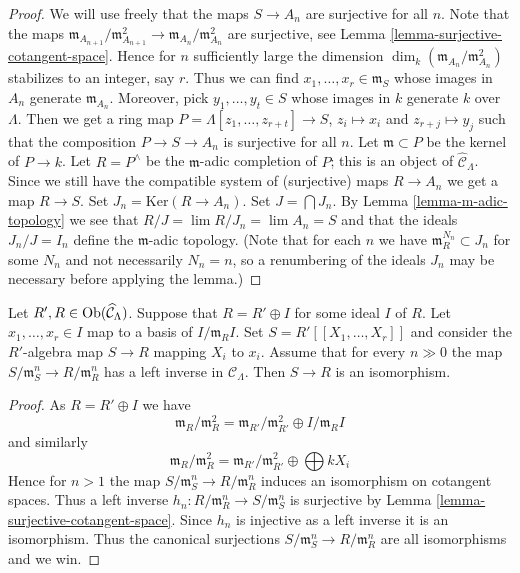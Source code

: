 \begin{proof}
We will use freely that the maps $S \to A_n$ are surjective for all $n$.
Note that the maps
$\mathfrak m_{A_{n + 1}}/\mathfrak m_{A_{n + 1}}^2 \to
\mathfrak m_{A_n}/\mathfrak m_{A_n}^2$ are surjective, see
Lemma \ref{lemma-surjective-cotangent-space}.
Hence for $n$ sufficiently large the dimension
$\dim_k (\mathfrak m_{A_n}/\mathfrak m_{A_n}^2)$ stabilizes to an
integer, say $r$.
Thus we can find $x_1, \ldots, x_r \in \mathfrak m_S$ whose images in
$A_n$ generate $\mathfrak m_{A_n}$. Moreover, pick $y_1, \ldots, y_t \in S$
whose images in $k$ generate $k$ over $\Lambda$. Then we get a ring map
$P = \Lambda[z_1, \ldots, z_{r + t}] \to S$, $z_i \mapsto x_i$ and
$z_{r + j} \mapsto y_j$ such that the composition
$P \to S \to A_n$ is surjective for all $n$. Let $\mathfrak m \subset P$
be the kernel of $P \to k$. Let $R = P^\wedge$ be the $\mathfrak m$-adic
completion of $P$; this is an object of $\widehat{\mathcal{C}}_\Lambda$.
Since we still have the compatible system of (surjective) maps $R \to A_n$
we get a map $R \to S$. Set $J_n = \text{Ker}(R \to A_n)$.
Set $J = \bigcap J_n$. By
Lemma \ref{lemma-m-adic-topology}
we see that $R/J = \lim R/J_n = \lim A_n = S$
and that the ideals $J_n/J = I_n$ define the $\mathfrak m$-adic topology.
(Note that for each $n$ we have $\mathfrak m_R^{N_n} \subset J_n$ for
some $N_n$ and not necessarily $N_n = n$, so a renumbering of the ideals
$J_n$ may be necessary before applying the lemma.)
\end{proof}

\begin{lemma}
\label{lemma-power-series}
Let $R', R \in \mathop{\rm Ob}\nolimits(\widehat{\mathcal{C}}_\Lambda)$. Suppose that
$R = R' \oplus I$ for some ideal $I$ of $R$. Let $x_1, \ldots, x_r \in I$
map to a basis of $I/\mathfrak m_R I$. Set $S = R'[[X_1, \ldots, X_r]]$
and consider the $R'$-algebra map $S \to R$ mapping $X_i$ to $x_i$.
Assume that for every $n \gg 0$ the map
$S/\mathfrak m_S^n \to R/\mathfrak m_R^n$ has a left inverse in
$\mathcal{C}_\Lambda$. Then $S \to R$ is an isomorphism.
\end{lemma}

\begin{proof}
As $R = R' \oplus I$ we have
$$
\mathfrak m_R/\mathfrak m_R^2 =
\mathfrak m_{R'}/\mathfrak m_{R'}^2 \oplus I/\mathfrak m_RI
$$
and similarly
$$
\mathfrak m_R/\mathfrak m_R^2 =
\mathfrak m_{R'}/\mathfrak m_{R'}^2 \oplus \bigoplus kX_i
$$
Hence for $n > 1$ the map $S/\mathfrak m_S^n \to R/\mathfrak m_R^n$
induces an isomorphism on cotangent spaces. Thus a left inverse
$h_n : R/\mathfrak m_R^n \to S/\mathfrak m_S^n$ is surjective by
Lemma \ref{lemma-surjective-cotangent-space}.
Since $h_n$ is injective as a left inverse it is an isomorphism.
Thus the canonical surjections $S/\mathfrak m_S^n \to R/\mathfrak m_R^n$
are all isomorphisms and we win.
\end{proof}




